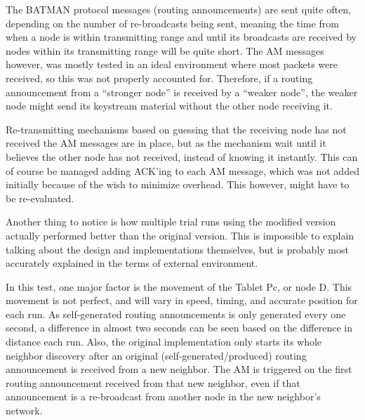 The BATMAN protocol messages (routing announcements) are sent quite often,
depending on the number of re-broadcasts being sent, meaning the time from when
a node is within transmitting range and until its broadcasts are received by
nodes within its transmitting range will be quite short. The \ac{AM} messages
however, was mostly tested in an ideal environment where most packets were
received, so this was not properly accounted for. Therefore, if a routing
announcement from a ``stronger node'' is received by a ``weaker node'', the
weaker node might send its keystream material without the other node receiving
it.

Re-transmitting mechanisms based on guessing that the receiving node has not
received the \ac{AM} messages are in place, but as the mechanism wait until it
believes the other node has not received, instead of knowing it instantly. This
can of course be managed adding ACK'ing to each \ac{AM} message, which was not
added initially because of the wish to minimize overhead. This however, might
have to be re-evaluated.

Another thing to notice is how multiple trial runs using the modified version
actually performed better than the original version. This is impossible to
explain talking about the design and implementations themselves, but is probably
most accurately explained in the terms of external environment.

In this test, one major factor is the movement of the Tablet Pc, or node D. This
movement is not perfect, and will vary in speed, timing, and accurate position
for each run. As self-generated routing announcements is only generated every
one second, a difference in almost two seconds can be seen based on the
difference in distance each run. Also, the original implementation only starts
its whole neighbor discovery after an original (self-generated/produced) routing
announcement is received from a new neighbor. The \ac{AM} is triggered on the
first routing announcement received from that new neighbor, even if that
announcement is a re-broadcast from another node in the new neighbor's network.
